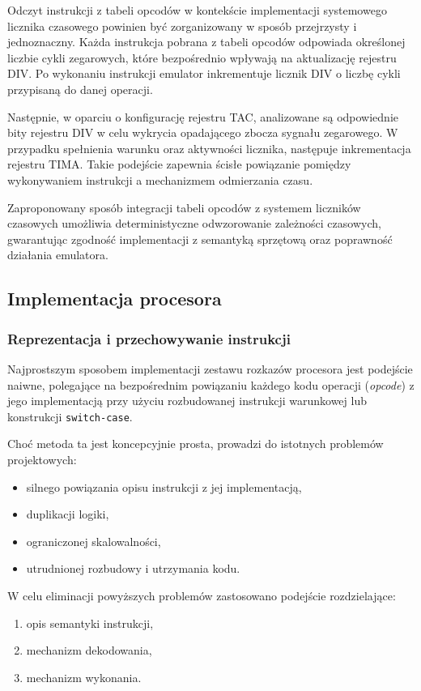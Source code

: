 \documentclass{article}
\begin{document}
Odczyt instrukcji z tabeli opcodów w kontekście implementacji systemowego licznika czasowego powinien być zorganizowany w sposób przejrzysty i jednoznaczny. Każda instrukcja pobrana z tabeli opcodów odpowiada określonej liczbie cykli zegarowych, które bezpośrednio wpływają na aktualizację rejestru DIV. Po wykonaniu instrukcji emulator inkrementuje licznik DIV o liczbę cykli przypisaną do danej operacji.

Następnie, w oparciu o konfigurację rejestru TAC, analizowane są odpowiednie bity rejestru DIV w celu wykrycia opadającego zbocza sygnału zegarowego. W przypadku spełnienia warunku oraz aktywności licznika, następuje inkrementacja rejestru TIMA. Takie podejście zapewnia ścisłe powiązanie pomiędzy wykonywaniem instrukcji a mechanizmem odmierzania czasu.

Zaproponowany sposób integracji tabeli opcodów z systemem liczników czasowych umożliwia deterministyczne odwzorowanie zależności czasowych, gwarantując zgodność implementacji z semantyką sprzętową oraz poprawność działania emulatora.
\subsection{Implementacja procesora}

\subsubsection{Reprezentacja i przechowywanie instrukcji}

Najprostszym sposobem implementacji zestawu rozkazów procesora jest podejście naiwne, polegające na bezpośrednim powiązaniu każdego kodu operacji (\textit{opcode}) z jego implementacją przy użyciu rozbudowanej instrukcji warunkowej lub konstrukcji \texttt{switch-case}.

Choć metoda ta jest koncepcyjnie prosta, prowadzi do istotnych problemów projektowych:
\begin{itemize}
	\item silnego powiązania opisu instrukcji z jej implementacją,
	\item duplikacji logiki,
	\item ograniczonej skalowalności,
	\item utrudnionej rozbudowy i utrzymania kodu.
\end{itemize}

W celu eliminacji powyższych problemów zastosowano podejście rozdzielające:
\begin{enumerate}
	\item opis semantyki instrukcji,
	\item mechanizm dekodowania,
	\item mechanizm wykonania.
\end{enumerate}
\end{document}
